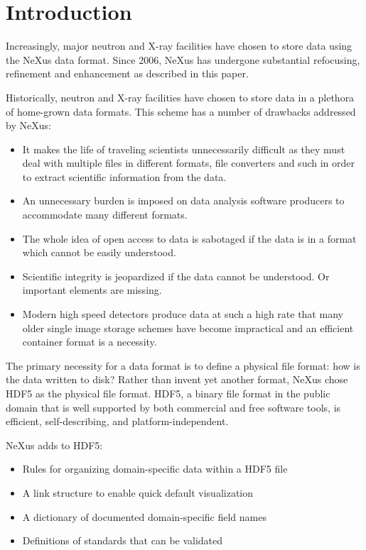 \documentclass[%
 aip,
rsi,
 amsmath,amssymb,
 reprint,%
]{revtex4-1}
\begin{document}
\maketitle


\section{Introduction}
Increasingly, major neutron and X-ray facilities have chosen to store data using the NeXus data format. 
Since 2006, NeXus\cite{nxold} has undergone substantial refocusing, 
refinement and enhancement as described in this paper.  

Historically, neutron and X-ray facilities have chosen to store data in a plethora of 
home-grown data formats. This scheme has a number of drawbacks addressed by NeXus: 
\begin{itemize}
\item It makes the life of traveling scientists unnecessarily difficult as they must deal with multiple files 
 in different formats, file converters and such in order to extract scientific information from the data.
 \item An unnecessary burden is imposed on data analysis software producers to accommodate many different formats.  
\item The whole idea of open access to data is sabotaged if the data is in a format which cannot be easily understood.
\item Scientific integrity is jeopardized if the data cannot be understood. Or important elements are missing.
\item Modern high speed detectors produce data at such a high rate that many older single image storage schemes 
 have become impractical and 
 an efficient container format is a necessity. 
\end{itemize}

The primary necessity for a data format is to define a physical file format: how is the data written to disk? Rather than invent
yet another format, NeXus chose HDF5\cite{hdf5} as the physical file format. 
HDF5, a binary file format in the public domain that is well supported by both commercial and free software tools, 
is efficient, self-describing, and platform-independent.

NeXus adds to HDF5:
\begin{itemize}
\item Rules for organizing domain-specific data within a HDF5 file
\item A link structure to enable quick default visualization
\item A dictionary of documented domain-specific field names
\item Definitions of standards that can be validated
\end{itemize}
\end{document}
